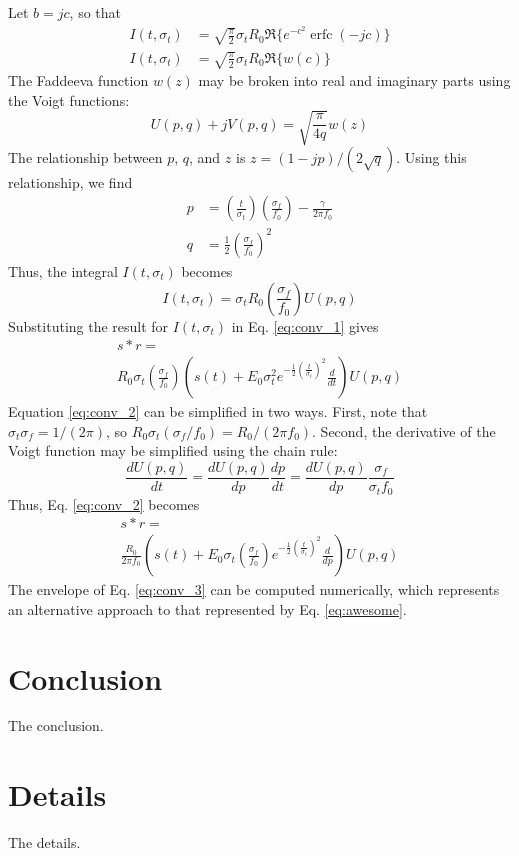 \documentclass[amsmath,amssymb,aps,prd,10pt,twocolumn,showkeys]{revtex4}
\DeclareMathOperator\erfc{erfc}
\begin{document}
\begin{itemize}
\begin{equation}
\end{equation}
Let $b = jc$, so that
\begin{align}
I(t,\sigma_t) &= \sqrt{\frac{\pi}{2}} \sigma_t R_0 \Re\lbrace e^{-c^2} \erfc(-jc) \rbrace \\
I(t,\sigma_t) &= \sqrt{\frac{\pi}{2}} \sigma_t R_0 \Re\lbrace w(c) \rbrace
\end{align}
The Faddeeva function $w(z)$ may be broken into real and imaginary parts using the Voigt functions:
\begin{equation}
U(p,q) + jV(p,q) = \sqrt{\frac{\pi}{4q}} w(z)
\end{equation}
The relationship between $p$, $q$, and $z$ is $z=(1-jp)/(2\sqrt{q})$.  Using this relationship, we find
\begin{align}
p &= \left(\frac{t}{\sigma_t}\right)\left(\frac{\sigma_f}{f_0}\right) - \frac{\gamma}{2\pi f_0} \\
q &= \frac{1}{2}\left(\frac{\sigma_f}{f_0}\right)^2
\end{align}
Thus, the integral $I(t,\sigma_t)$ becomes
\begin{equation}
I(t,\sigma_t) = \sigma_t R_0 \left(\frac{\sigma_f}{f_0}\right) U(p,q)
\end{equation}
Substituting the result for $I(t,\sigma_t)$ in Eq. \ref{eq:conv_1} gives
\begin{multline}
s * r = \\
 R_0\sigma_t \left(\frac{\sigma_f}{f_0}\right) \left(s(t) + E_0 \sigma_t^2 e^{-\frac{1}{2}\left(\frac{t}{\sigma_t}\right)^2} \frac{d}{dt} \right) U(p,q) \label{eq:conv_2}
\end{multline}
Equation \ref{eq:conv_2} can be simplified in two ways.  First, note that $\sigma_t \sigma_f = 1/(2\pi)$, so $R_0\sigma_t (\sigma_f/f_0) = R_0/(2\pi f_0)$.  Second, the derivative of the Voigt function may be simplified using the chain rule:
\begin{equation}
\frac{dU(p,q)}{dt} = \frac{dU(p,q)}{dp}\frac{dp}{dt} = \frac{dU(p,q)}{dp} \frac{\sigma_f}{\sigma_t f_0}
\end{equation}
Thus, Eq. \ref{eq:conv_2} becomes
\begin{multline}
s * r = \\
\frac{R_0}{2\pi f_0}\left(s(t) + E_0 \sigma_t \left(\frac{\sigma_f}{f_0}\right) e^{-\frac{1}{2}\left(\frac{t}{\sigma_t}\right)^2} \frac{d}{dp}\right)U(p,q) \label{eq:conv_3}
\end{multline}
The envelope of Eq. \ref{eq:conv_3} can be computed numerically, which represents an alternative approach to that represented by Eq. \ref{eq:awesome}.
\end{itemize}

\section{Conclusion}
\label{sec:conc}

The conclusion.

\appendix

\section{Details}
\label{app:a}

The details.


\end{document}
